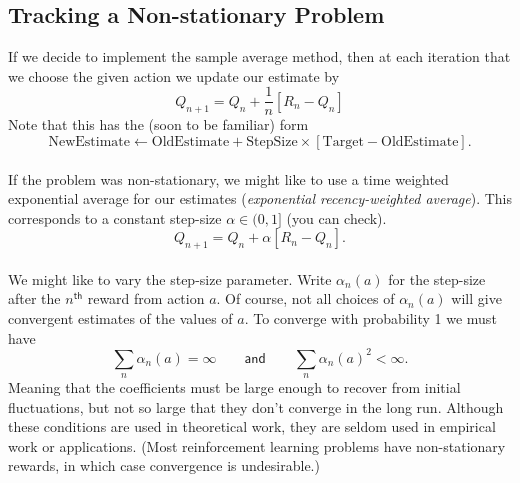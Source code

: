 \documentclass[a4paper, oneside, 11pt]{article}
\begin{document}
\subsection{Tracking a Non-stationary Problem}
If we decide to implement the sample average method, then at each iteration that we choose the given action we update our estimate by
\begin{equation}
    Q_{n+1} = Q_n + \frac1n [R_n - Q_n]
\end{equation}
Note that this has the (soon to be familiar) form
\begin{equation}
    \mathrm{NewEstimate} \gets \mathrm{OldEstimate} + \mathrm{StepSize}\times[\mathrm{Target} - \mathrm{OldEstimate}].
\end{equation}
\mbox{}\\
If the problem was non-stationary, we might like to use a time weighted exponential average for our estimates (\emph{exponential recency-weighted average}). This corresponds to a constant step-size $\alpha \in (0, 1]$ (you can check).
\begin{equation}
    Q_{n+1} = Q_n + \alpha [R_n - Q_n].
\end{equation}
\mbox{}\\
We might like to vary the step-size parameter. Write $\alpha_n(a)$ for the step-size after the $n^{\mathsf{th}}$ reward from action $a$. Of course, not all choices of $\alpha_n(a)$ will give convergent estimates of the values of $a$. To converge with probability 1 we must have
\begin{equation}
    \sum_n \alpha_n(a) = \infty \quad\quad \mathsf{and} \quad\quad  \sum_n \alpha_n(a)^2 < \infty.
\end{equation}
Meaning that the coefficients must be large enough to recover from initial fluctuations, but not so large that they don't converge in the long run. Although these conditions are used in theoretical work, they are seldom used in empirical work or applications. (Most reinforcement learning problems have non-stationary rewards, in which case convergence is undesirable.)
\end{document}
